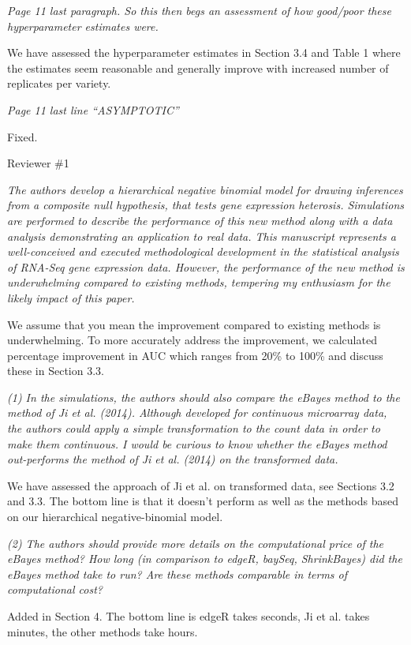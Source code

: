 \documentclass{article}
\newcommand{\comment}[1]{\textit{#1}}
\newcommand{\response}[1]{#1}
\begin{document}
\comment{Page 11 last paragraph.  So this then begs an assessment of how good/poor these hyperparameter estimates were.}

\response{We have assessed the hyperparameter estimates in Section 3.4 and Table 1 where the estimates seem reasonable and generally improve with increased number of replicates per variety.}

\comment{Page 11 last line “ASYMPTOTIC”}

\response{Fixed.}

Reviewer \#1

\comment{The authors develop a hierarchical negative binomial model for drawing inferences from a composite null hypothesis, that tests gene expression heterosis. Simulations are performed to describe the performance of this new method along with a data analysis demonstrating an application to real data. This manuscript represents a well-conceived and executed methodological development in the statistical analysis of RNA-Seq gene expression data. However, the performance of the new method is underwhelming compared to existing methods, tempering my enthusiasm for the likely impact of this paper.}

\response{We assume that you mean the improvement compared to existing methods is underwhelming. To more accurately address the improvement, we calculated percentage improvement in AUC which ranges from 20\% to 100\% and discuss these in Section 3.3.}

\comment{(1) In the simulations, the authors should also compare the eBayes method to the method of Ji et al. (2014). Although developed for continuous microarray data, the authors could apply a simple transformation to the count data in order to make them continuous. I would be curious to know whether the eBayes method out-performs the method of Ji et al. (2014) on the transformed data.}

\response{We have assessed the approach of Ji et al. on transformed data, see Sections 3.2 and 3.3. The bottom line is that it doesn't perform as well as the methods based on our hierarchical negative-binomial model.}

\comment{(2) The authors should provide more details on the computational price of the eBayes method? How long (in comparison to edgeR, baySeq, ShrinkBayes) did the eBayes method take to run? Are these methods comparable in terms of computational cost?}

\response{Added in Section 4. The bottom line is edgeR takes seconds, Ji et al. takes minutes, the other methods take hours.}
\end{document}
